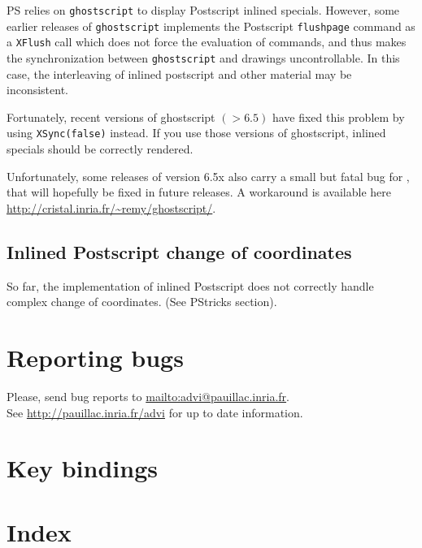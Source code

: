\documentclass[12pt]{article}
\begin{document}
PS relies on {\tt ghostscript} to display Postscript inlined specials.
However, some earlier releases of {\tt ghostscript} 
implements the Postscript {\tt flushpage} command as a {\tt XFlush} call
which does not force the evaluation of commands, and thus makes the 
synchronization between {\tt ghostscript} and {\ActiveDVI} drawings
uncontrollable. In this case, the interleaving of inlined postscript 
and other material may be inconsistent. 

Fortunately, recent versions of ghostscript $(> 6.5)$ have
fixed this problem by using {\tt XSync(false)} instead.
If you use those versions of ghostscript, inlined specials should be
correctly rendered.

Unfortunately, some releases of version 6.5x also carry a small but
fatal bug for \ActiveDVI, that will hopefully be fixed in future
releases. A workaround is available here
\url{http://cristal.inria.fr/~remy/ghostscript/}.

\subsection*{Inlined Postscript change of coordinates}

So far, the implementation of inlined Postscript does not correctly handle
complex change of coordinates.  (See PStricks section). 

\section{Reporting bugs}

Please, send bug reports to 
\url{mailto:advi@pauillac.inria.fr}. 
\\
See \url{http://pauillac.inria.fr/advi} for up to date information.


\section{Key bindings}

\def\key#1{\textcolor{red}{#1}}
\def\ikey#1#2#3{\key{#1} & #2 & -- & #3\\}
\def\arg{\textcolor{blue}{arg }}

\let \Newpage \newpage
\def \newpage {}


\def \newpage{\Newpage}

\section{Index}

\printindex
\end{document}
